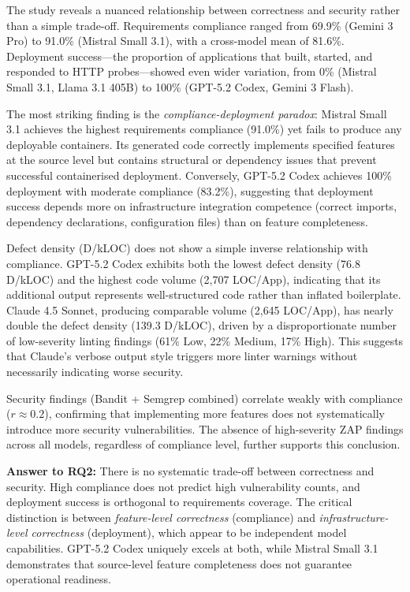The study reveals a nuanced relationship between correctness and security rather than a simple trade-off. Requirements compliance ranged from 69.9\% (Gemini 3 Pro) to 91.0\% (Mistral Small 3.1), with a cross-model mean of 81.6\%. Deployment success---the proportion of applications that built, started, and responded to HTTP probes---showed even wider variation, from 0\% (Mistral Small 3.1, Llama 3.1 405B) to 100\% (GPT-5.2 Codex, Gemini 3 Flash).

The most striking finding is the \textit{compliance-deployment paradox}: Mistral Small 3.1 achieves the highest requirements compliance (91.0\%) yet fails to produce any deployable containers. Its generated code correctly implements specified features at the source level but contains structural or dependency issues that prevent successful containerised deployment. Conversely, GPT-5.2 Codex achieves 100\% deployment with moderate compliance (83.2\%), suggesting that deployment success depends more on infrastructure integration competence (correct imports, dependency declarations, configuration files) than on feature completeness.

Defect density (D/kLOC) does not show a simple inverse relationship with compliance. GPT-5.2 Codex exhibits both the lowest defect density (76.8 D/kLOC) and the highest code volume (2{,}707 LOC/App), indicating that its additional output represents well-structured code rather than inflated boilerplate. Claude 4.5 Sonnet, producing comparable volume (2{,}645 LOC/App), has nearly double the defect density (139.3 D/kLOC), driven by a disproportionate number of low-severity linting findings (61\% Low, 22\% Medium, 17\% High). This suggests that Claude's verbose output style triggers more linter warnings without necessarily indicating worse security.

Security findings (Bandit + Semgrep combined) correlate weakly with compliance ($r \approx 0.2$), confirming that implementing more features does not systematically introduce more security vulnerabilities. The absence of high-severity ZAP findings across all models, regardless of compliance level, further supports this conclusion.

\textbf{Answer to RQ2:} There is no systematic trade-off between correctness and security. High compliance does not predict high vulnerability counts, and deployment success is orthogonal to requirements coverage. The critical distinction is between \textit{feature-level correctness} (compliance) and \textit{infrastructure-level correctness} (deployment), which appear to be independent model capabilities. GPT-5.2 Codex uniquely excels at both, while Mistral Small 3.1 demonstrates that source-level feature completeness does not guarantee operational readiness.

